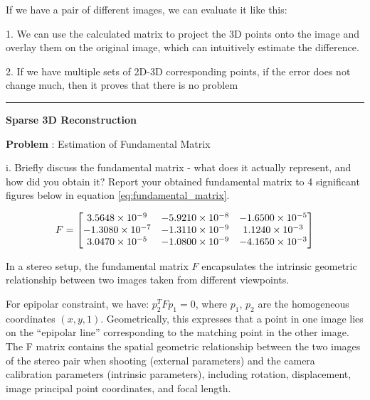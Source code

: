 \documentclass[onecolumn,10pt]{article}
\begin{document}
If we have a pair of different images, we can evaluate it like this:

1. We can use the calculated matrix to project the 3D points onto the image and overlay them on the original image, which can intuitively estimate the difference.

2. If we have multiple sets of 2D-3D corresponding points, if the error does not change much, then it proves that there is no problem

\hrule

\noindent\textbf{Sparse 3D Reconstruction}


\addtocounter{problemnumber}{1}
\noindent\textbf{Problem }:  Estimation of Fundamental Matrix

i. Briefly discuss the fundamental matrix - what does it actually represent, and how did you obtain it? Report your obtained fundamental matrix to 4 significant figures below in equation \ref{eq:fundamental_matrix}.

\begin{align}
F = \begin{bmatrix}
\multicolumn{1}{c}{3.5648 \times 10^{-9}} & \multicolumn{1}{c}{-5.9210 \times 10^{-8}} & \multicolumn{1}{c}{-1.6500 \times 10^{-5}} \\
\multicolumn{1}{c}{-1.3080 \times 10^{-7}} & \multicolumn{1}{c}{-1.3110 \times 10^{-9}} & \multicolumn{1}{c}{1.1240 \times 10^{-3}} \\
\multicolumn{1}{c}{3.0470 \times 10^{-5}}  & \multicolumn{1}{c}{-1.0800 \times 10^{-9}} & \multicolumn{1}{c}{-4.1650 \times 10^{-3}} \\
\end{bmatrix}
\label{eq:fundamental_matrix}
\end{align}


In a stereo setup, the fundamental matrix $F$ encapsulates the intrinsic geometric relationship between two images taken from different viewpoints.

For epipolar constraint, we have: $p_2^T F p_1 = 0$, where $p_1$, $p_2$ are the homogeneous coordinates $(x,y,1)$. Geometrically, this expresses that a point in one image lies on the “epipolar line” corresponding to the matching point in the other image. The F matrix contains the spatial geometric relationship between the two images of the stereo pair when shooting (external parameters) and the camera calibration parameters (intrinsic parameters), including rotation, displacement, image principal point coordinates, and focal length.
\end{document}
